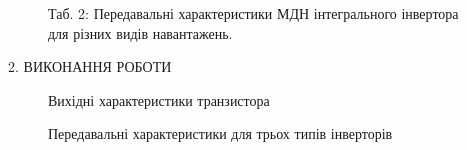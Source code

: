 \documentclass[a4paper,14pt]{extreport}
\begin{document}
\vspace{1cm}

\begin{figure}[h]
Таб. 2: Передавальні характеристики МДН інтегрального інвертора для різних видів навантажень.
\end{figure}
\clearpage

\newpage
\begin{center}2. ВИКОНАННЯ РОБОТИ\\ \end{center}

  \begin{figure}[h]
  \caption{Вихідні характеристики транзистора}
  \end{figure}

\vspace{1cm}


\begin{figure}[h]
\caption{Передавальні характеристики для трьох типів інверторів}
\end{figure}
\end{document}
